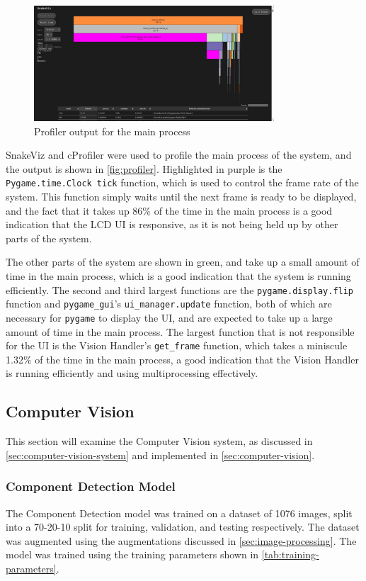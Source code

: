 \begin{figure}[H]
  \centering
  \includegraphics[width=0.8\textwidth]{imgs/software/profiler.jpg}
  \caption{Profiler output for the main process}
  \label{fig:profiler}
\end{figure}

SnakeViz \cite{snakeviz} and cProfiler were used to profile the main process of the system, and the output is shown in \autoref{fig:profiler}. Highlighted in purple is the \texttt{Pygame.time.Clock tick} function, which is used to control the frame rate of the system. This function simply waits until the next frame is ready to be displayed, and the fact that it takes up 86\% of the time in the main process is a good indication that the LCD UI is responsive, as it is not being held up by other parts of the system.

The other parts of the system are shown in green, and take up a small amount of time in the main process, which is a good indication that the system is running efficiently. The second and third largest functions are the \texttt{pygame.display.flip} function and \texttt{pygame\_gui}'s \texttt{ui\_manager.update} function, both of which are necessary for \texttt{pygame} to display the UI, and are expected to take up a large amount of time in the main process. The largest function that is not responsible for the UI is the Vision Handler's \texttt{get\_frame} function, which takes a miniscule 1.32\% of the time in the main process, a good indication that the Vision Handler is running efficiently and using multiprocessing effectively.

\subsection{Computer Vision}
\label{sec:computer-vision-evaluation}
This section will examine the Computer Vision system, as discussed in \autoref{sec:computer-vision-system} and implemented in \autoref{sec:computer-vision}.

\subsubsection{Component Detection Model}
The Component Detection model was trained on a dataset of 1076 images, split into a 70-20-10 split for training, validation, and testing respectively. The dataset was augmented using the augmentations discussed in \autoref{sec:image-processing}. The model was trained using the training parameters shown in \autoref{tab:training-parameters}.

